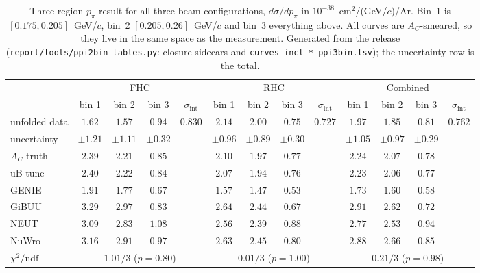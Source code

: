\documentclass[11pt,a4paper]{article}
\begin{document}
\begin{table}[htbp]\centering
\caption{Three-region $p_\pi$ result for all three beam configurations, $d\sigma/dp_\pi$ in
  $10^{-38}$~cm$^2$/(GeV/$c$)/Ar. Bin~1 is $[0.175,0.205]$~GeV/$c$, bin~2 $[0.205,0.26]$~GeV/$c$
  and bin~3 everything above. All curves are $A_C$-smeared, so they live in the same space as
  the measurement. Generated from the release (\texttt{report/tools/ppi2bin\_tables.py}:
  closure sidecars and \texttt{curves\_incl\_*\_ppi3bin.tsv}); the uncertainty row is the total.}
\label{tab:ppi2bin}
\footnotesize\setlength{\tabcolsep}{2.5pt}
\begin{tabular}{lcccc|cccc|cccc}
\toprule
 & \multicolumn{4}{c|}{FHC} & \multicolumn{4}{c|}{RHC} & \multicolumn{4}{c}{Combined} \\
 & bin 1 & bin 2 & bin 3 & $\sigma_\mathrm{int}$ & bin 1 & bin 2 & bin 3 & $\sigma_\mathrm{int}$ & bin 1 & bin 2 & bin 3 & $\sigma_\mathrm{int}$ \\\midrule
unfolded data & $1.62$ & $1.57$ & $0.94$ & $0.830$ & $2.14$ & $2.00$ & $0.75$ & $0.727$ & $1.97$ & $1.85$ & $0.81$ & $0.762$ \\
uncertainty   & $\pm1.21$ & $\pm1.11$ & $\pm0.32$ &  & $\pm0.96$ & $\pm0.89$ & $\pm0.30$ &  & $\pm1.05$ & $\pm0.97$ & $\pm0.29$ &  \\
$A_C$ truth   & $2.39$ & $2.21$ & $0.85$ &  & $2.10$ & $1.97$ & $0.77$ &  & $2.24$ & $2.07$ & $0.78$ &  \\
uB tune       & $2.40$ & $2.22$ & $0.84$ &  & $2.07$ & $1.94$ & $0.76$ &  & $2.23$ & $2.06$ & $0.77$ &  \\\midrule
GENIE & $1.91$ & $1.77$ & $0.67$ &  & $1.57$ & $1.47$ & $0.53$ &  & $1.73$ & $1.60$ & $0.58$ &  \\
GiBUU & $3.29$ & $2.97$ & $0.83$ &  & $2.64$ & $2.44$ & $0.67$ &  & $2.91$ & $2.62$ & $0.72$ &  \\
NEUT  & $3.09$ & $2.83$ & $1.08$ &  & $2.56$ & $2.39$ & $0.88$ &  & $2.77$ & $2.53$ & $0.94$ &  \\
NuWro & $3.16$ & $2.91$ & $0.97$ &  & $2.63$ & $2.45$ & $0.80$ &  & $2.88$ & $2.66$ & $0.85$ &  \\
\midrule
$\chi^2/\mathrm{ndf}$ & \multicolumn{4}{c|}{$1.01/3$ ($p=0.80$)} & \multicolumn{4}{c|}{$0.01/3$ ($p=1.00$)} & \multicolumn{4}{c}{$0.21/3$ ($p=0.98$)} \\
\bottomrule
\end{tabular}
\end{table}
\end{document}
